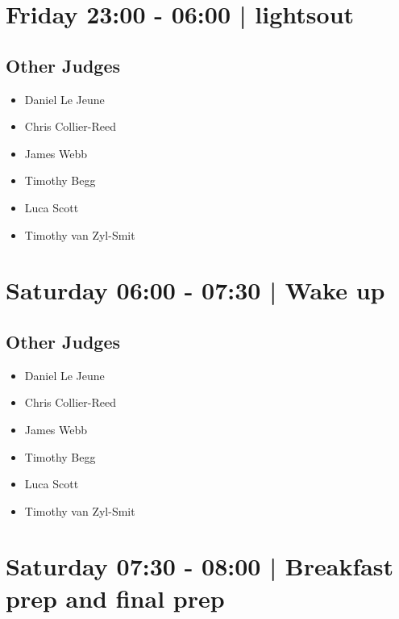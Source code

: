 \documentclass[10pt]{article}
\begin{document}
            \section*{Friday 23:00
        -
        06:00
        |
         lightsout}
        
                
        \subsection*{Other Judges}
        
            \begin{itemize}
                            \item Daniel Le Jeune
                            \item Chris Collier-Reed
                            \item James Webb
                            \item Timothy Begg
                            \item Luca Scott
                            \item Timothy van Zyl-Smit
                        \end{itemize}
        

            \section*{Saturday 06:00
        -
        07:30
        |
         Wake up}
        
                
        \subsection*{Other Judges}
        
            \begin{itemize}
                            \item Daniel Le Jeune
                            \item Chris Collier-Reed
                            \item James Webb
                            \item Timothy Begg
                            \item Luca Scott
                            \item Timothy van Zyl-Smit
                        \end{itemize}
        

            \section*{Saturday 07:30
        -
        08:00
        |
         Breakfast prep and final prep}
        
\end{document}
